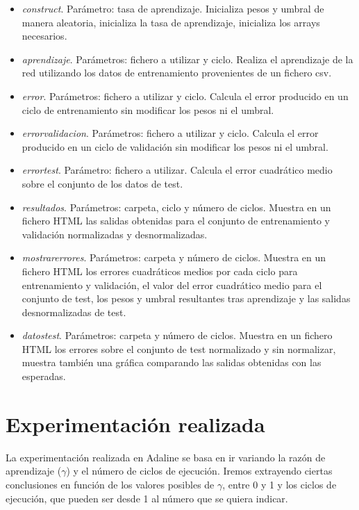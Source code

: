 \documentclass[11pt,spanish,listoffigures,listoftables]{tfgetsinf}
\begin{document}
\begin{itemize}
\item \textit{construct}. Parámetro: tasa de aprendizaje. Inicializa pesos y umbral de manera aleatoria, inicializa la tasa de aprendizaje, inicializa los arrays necesarios.
\item \textit{aprendizaje}. Parámetros: fichero a utilizar y ciclo. Realiza el aprendizaje de la red utilizando los datos de entrenamiento provenientes de un fichero csv.
\item \textit{error}. Parámetros: fichero a utilizar y ciclo. Calcula el error producido en un ciclo de entrenamiento sin modificar los pesos ni el umbral.
\item \textit{errorvalidacion}. Parámetros: fichero a utilizar y ciclo. Calcula el error producido en un ciclo de validación sin modificar los pesos ni el umbral.
\item \textit{errortest}. Parámetro: fichero a utilizar. Calcula el error cuadrático medio sobre el conjunto de los datos de test.
\item \textit{resultados}. Parámetros: carpeta, ciclo y número de ciclos. Muestra en un fichero HTML las salidas obtenidas para el conjunto de entrenamiento y validación normalizadas y desnormalizadas.
\item \textit{mostrarerrores}. Parámetros: carpeta y número de ciclos. Muestra en un fichero HTML los errores cuadráticos medios por cada ciclo para entrenamiento y validación, el valor del error cuadrático medio para el conjunto de test, los pesos y umbral resultantes tras aprendizaje y las salidas desnormalizadas de test.
\item \textit{datostest}. Parámetros: carpeta y número de ciclos. Muestra en un fichero HTML los errores sobre el conjunto de test normalizado y sin normalizar, muestra también una gráfica comparando las salidas obtenidas con las esperadas.
\end{itemize}

\section{Experimentación realizada}

\par La experimentación realizada en Adaline se basa en ir variando la razón de aprendizaje ($\gamma$) y el número de ciclos de ejecución. Iremos extrayendo ciertas conclusiones en función de los valores posibles de $\gamma$, entre 0 y 1 y los ciclos de ejecución, que pueden ser desde 1 al número que se quiera indicar.
\end{document}
